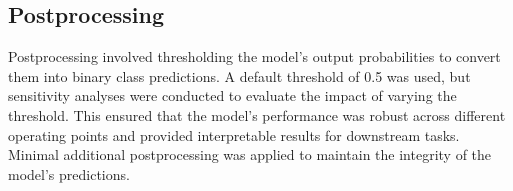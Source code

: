 \subsection{Postprocessing}

Postprocessing involved thresholding the model's output probabilities to convert them into binary class predictions. A default threshold of 0.5 was used, but sensitivity analyses were conducted to evaluate the impact of varying the threshold. This ensured that the model's performance was robust across different operating points and provided interpretable results for downstream tasks. Minimal additional postprocessing was applied to maintain the integrity of the model's predictions.


